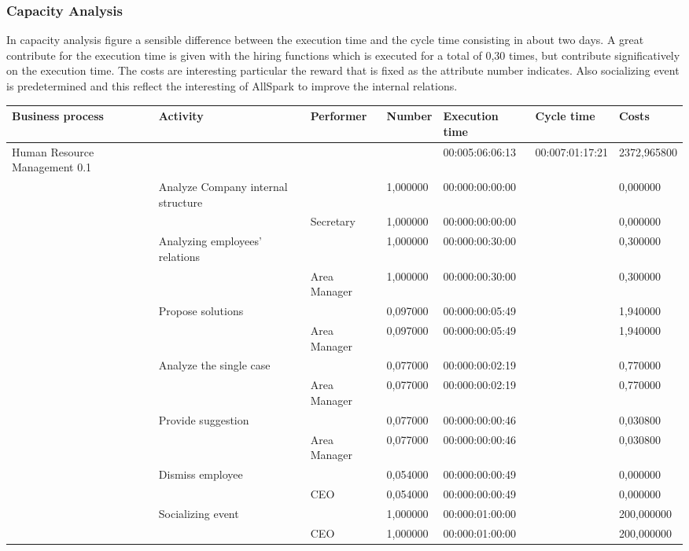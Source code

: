 \subsubsection{Capacity Analysis}
In capacity analysis figure a sensible difference between the execution time and the cycle time consisting in about two days. A great contribute for the execution time is given with the hiring functions which is executed for a total of 0,30 times, but contribute significatively on the execution time. The costs are interesting particular the reward that is fixed as the attribute number indicates. Also socializing event is predetermined and this reflect the interesting of AllSpark to improve the internal relations.


\begin{landscape}
\begin{table}
\centering
{\tiny
\begin{tabular}{|l|l|l|l|l|l|l|}
Business process&Activity&Performer&Number&Execution time&Cycle time&Costs\\
\hline
Human Resource Management 0.1&&&&00:005:06:06:13&00:007:01:17:21&2372,965800\\
\hline
&Analyze Company internal structure &&1,000000&00:000:00:00:00&&0,000000\\
\hline
&&Secretary &1,000000&00:000:00:00:00&&0,000000\\
\hline
&Analyzing employees' relations &&1,000000&00:000:00:30:00&&0,300000\\
\hline
&&Area Manager &1,000000&00:000:00:30:00&&0,300000\\
\hline
&Propose solutions &&0,097000&00:000:00:05:49&&1,940000\\
\hline
&&Area Manager &0,097000&00:000:00:05:49&&1,940000\\
\hline
&Analyze the single case &&0,077000&00:000:00:02:19&&0,770000\\
\hline
&&Area Manager &0,077000&00:000:00:02:19&&0,770000\\
\hline
&Provide suggestion &&0,077000&00:000:00:00:46&&0,030800\\
\hline
&&Area Manager &0,077000&00:000:00:00:46&&0,030800\\
\hline
&Dismiss employee &&0,054000&00:000:00:00:49&&0,000000\\
\hline
&&CEO &0,054000&00:000:00:00:49&&0,000000\\
\hline
&Socializing event &&1,000000&00:000:01:00:00&&200,000000\\
\hline
&&CEO &1,000000&00:000:01:00:00&&200,000000\\

\end{tabular}}
\end{table}
\end{landscape}
